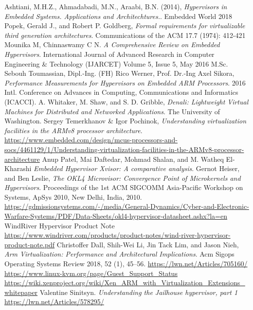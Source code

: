 \documentclass[spanish,12pt,a4paper,oneside]{book}
\begin{document}
\begin{thebibliography}{00}
	  Ashtiani, M.H.Z., Ahmadabadi, M.N., Araabi, B.N. (2014), \emph{Hypervisors in Embedded Systems. Applications and Architechtures.}. Embedded World 2018
	 Popek, Gerald J., and Robert P. Goldberg, \emph{Formal requirements for virtualizable third generation architectures}. Communications of the ACM 17.7 (1974): 412-421
	 Mounika M, Chinnaswamy C N. \emph{A Comprehensive Review on Embedded Hypervisors}. International Journal of Advanced Research in Computer Engineering \& Technology (IJARCET) Volume 5, Issue 5, May 2016
	 M.Sc. Sebouh Toumassian, Dipl.-Ing. (FH) Rico Werner, Prof. Dr.-Ing Axel Sikora, \emph{Performance Measurements for Hypervisors on Embedded ARM Processors}. 2016 Intl. Conference on Advances in Computing, Communications and Informatics (ICACCI).
	 A. Whitaker, M. Shaw, and S. D. Gribble, \emph{Denali: Lightweight Virtual Machines for Distributed and Networked Applications}. The University of Washington.
	 Sergey Temerkhanov \& Igor Pochinok, \emph{Understanding virtualization facilities in the ARMv8 processor architecture}. \url{https://www.embedded.com/design/mcus-processors-and-socs/4461129/1/Understanding-virtualization-facilities-in-the-ARMv8-processor-architecture}
	 Anup Patel, Mai Daftedar, Mohmad Shalan, and M. Watheq El-Kharashi \emph{Embedded Hypervisor Xvisor: A comparative analysis}.
	 Gernot Heiser, and Ben Leslie, \emph{The OKL4 Microvisor: Convergence Point of Microkernels and Hypervisors}. Proceedings of the 1st ACM SIGCOMM Asia-Pacific Workshop on Systems, ApSys 2010, New Delhi, India, 2010.
	 \url{https://gdmissionsystems.com/-/media/General-Dynamics/Cyber-and-Electronic-Warfare-Systems/PDF/Data-Sheets/okl4-hypervisor-datasheet.ashx?la=en}
	 WindRiver Hypervisor Product Note \url{https://www.windriver.com/products/product-notes/wind-river-hypervisor-product-note.pdf}
   Christoffer Dall, Shih-Wei Li, Jin Tack Lim, and Jason Nieh, \emph{Arm Virtualization: Performance and Architectural Implications}. Acm Sigops Operating Systems Review 2018, 52 (1), 45–56.
	 \url{https://lwn.net/Articles/705160/}
   \url{https://www.linux-kvm.org/page/Guest_Support_Status}
   \url{https://wiki.xenproject.org/wiki/Xen_ARM_with_Virtualization_Extensions_whitepaper}
   Valentine Sinitsyn. \emph{Understanding the Jailhouse hypervisor, part 1} \url{https://lwn.net/Articles/578295/}

\end{thebibliography}
\end{document}
